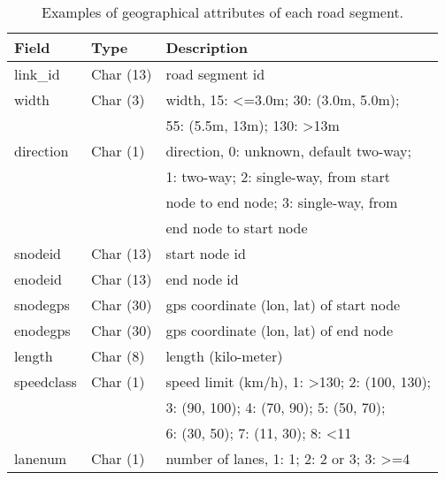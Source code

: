 \begin{table}[htbp]
\centering
\caption{Examples of geographical attributes of each road segment.}
\label{tab:linkproperties}
\begin{tabular}{lll}
\toprule
Field & Type & Description  \\
\midrule
link\_id & Char (13) & road segment id \\
width & Char (3) & width, 15: <=3.0m; 30:  (3.0m, 5.0m); \\
 & & 55:  (5.5m, 13m); 130: >13m \\
direction & Char (1) & direction, 0: unknown, default two-way; \\
 & & 1: two-way; 2: single-way, from start \\
 & & node to end node; 3: single-way, from \\
 & & end node to start node \\
snodeid & Char (13) & start node id \\
enodeid & Char (13) & end node id \\
snodegps & Char (30) & gps coordinate (lon, lat) of start node\\
enodegps & Char (30) & gps coordinate (lon, lat) of end node \\
length & Char (8) & length (kilo-meter) \\
speedclass & Char (1) & speed limit (km/h), 1: >130; 2:  (100, 130); \\
 & & 3:  (90, 100); 4:  (70, 90); 5:  (50, 70); \\
 & & 6:  (30, 50);  7:  (11, 30); 8: <11 \\
lanenum & Char (1) & number of lanes, 1: 1; 2: 2 or 3; 3: >=4 \\
\bottomrule
\end{tabular}
\end{table}


